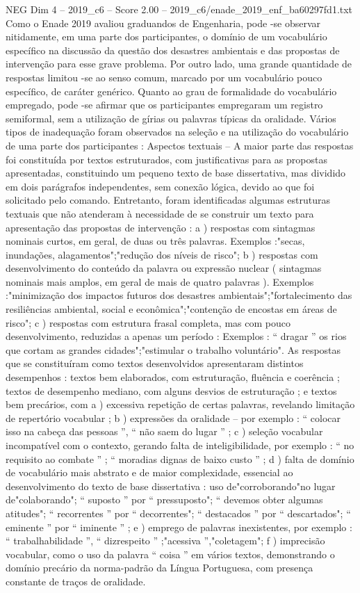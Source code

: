 \begin{textsample}{NEG Dim 4 – 2019\_c6 – Score 2.00 – 2019\_c6/enade\_2019\_enf\_ba60297fd1.txt}
Como o Enade 2019 avaliou graduandos de Engenharia, pode -se observar nitidamente, em uma parte dos participantes, o domínio de um vocabulário específico na discussão da questão dos desastres ambientais e das propostas de intervenção para esse grave problema.
Por outro lado, uma grande quantidade de respostas limitou -se ao senso comum, marcado por um vocabulário pouco específico, de caráter genérico.
Quanto ao grau de formalidade do vocabulário empregado, pode -se afirmar que os participantes empregaram um registro semiformal, sem a utilização de gírias ou palavras típicas da oralidade.
Vários tipos de inadequação foram observados na seleção e na utilização do vocabulário de uma parte dos participantes : Aspectos textuais – A maior parte das respostas foi constituída por textos estruturados, com justificativas para as propostas apresentadas, constituindo um pequeno texto de base dissertativa, mas dividido em dois parágrafos independentes, sem conexão lógica, devido ao que foi solicitado pelo comando.
Entretanto, foram identificadas algumas estruturas textuais que não atenderam à necessidade de se construir um texto para apresentação das propostas de intervenção : a ) respostas com sintagmas nominais curtos, em geral, de duas ou três palavras.
Exemplos :"secas, inundações, alagamentos";"redução dos níveis de risco"; b ) respostas com desenvolvimento do conteúdo da palavra ou expressão nuclear ( sintagmas nominais mais amplos, em geral de mais de quatro palavras ).
Exemplos :"minimização dos impactos futuros dos desastres ambientais";"fortalecimento das resiliências ambiental, social e econômica";"contenção de encostas em áreas de risco"; c ) respostas com estrutura frasal completa, mas com pouco desenvolvimento, reduzidas a apenas um período : Exemplos : “ dragar ” os rios que cortam as grandes cidades";"estimular o trabalho voluntário".
As respostas que se constituíram como textos desenvolvidos apresentaram distintos desempenhos : textos bem elaborados, com estruturação, fluência e coerência ; textos de desempenho mediano, com alguns desvios de estruturação ; e textos bem precários, com a ) excessiva repetição de certas palavras, revelando limitação de repertório vocabular ; b ) expressões da oralidade – por exemplo : “ colocar isso na cabeça das pessoas ”, “ não saem do lugar ” ; c ) seleção vocabular incompatível com o contexto, gerando falta de inteligibilidade, por exemplo : “ no requisito ao combate ” ; “ moradias dignas de baixo custo ” ; d ) falta de domínio de vocabulário mais abstrato e de maior complexidade, essencial ao desenvolvimento do texto de base dissertativa : uso de"corroborando"no lugar de"colaborando"; “ suposto ” por “ pressuposto"; “ devemos obter algumas atitudes"; “ recorrentes ” por “ decorrentes"; “ destacados ” por “ descartados"; “ eminente ” por “ iminente ” ; e ) emprego de palavras inexistentes, por exemplo : “ trabalhabilidade ”, “ dizrespeito ” ;"acessiva ”,"coletagem"; f ) imprecisão vocabular, como o uso da palavra “ coisa ” em vários textos, demonstrando o domínio precário da norma-padrão da Língua Portuguesa, com presença constante de traços de oralidade.

\end{textsample}

